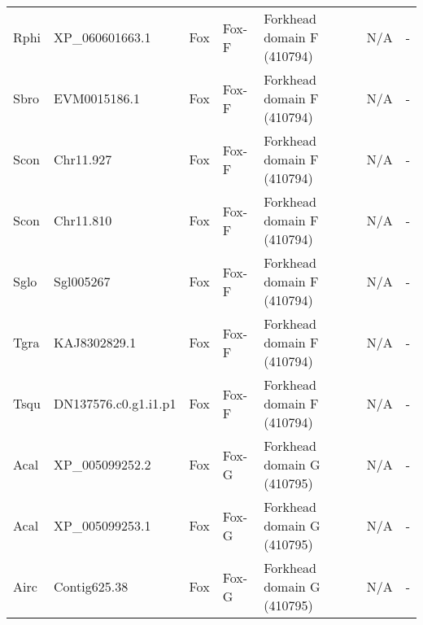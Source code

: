 \documentclass[../main.tex]{subfiles}
\begin{document}
\begin{landscape}
\begin{longtable}{lllllll}
		Rphi           & XP\_060601663.1       & Fox            & Fox-F               & Forkhead domain F (410794)                  & N/A                                                                    & -                    \\
		Sbro           & EVM0015186.1          & Fox            & Fox-F               & Forkhead domain F (410794)                  & N/A                                                                    & -                    \\
		Scon           & Chr11.927             & Fox            & Fox-F               & Forkhead domain F (410794)                  & N/A                                                                    & -                    \\
		Scon           & Chr11.810             & Fox            & Fox-F               & Forkhead domain F (410794)                  & N/A                                                                    & -                    \\
		Sglo           & Sgl005267             & Fox            & Fox-F               & Forkhead domain F (410794)                  & N/A                                                                    & -                    \\
		Tgra           & KAJ8302829.1          & Fox            & Fox-F               & Forkhead domain F (410794)                  & N/A                                                                    & -                    \\
		Tsqu           & DN137576.c0.g1.i1.p1  & Fox            & Fox-F               & Forkhead domain F (410794)                  & N/A                                                                    & -                    \\
		Acal           & XP\_005099252.2       & Fox            & Fox-G               & Forkhead domain G (410795)                  & N/A                                                                    & -                    \\
		Acal           & XP\_005099253.1       & Fox            & Fox-G               & Forkhead domain G (410795)                  & N/A                                                                    & -                    \\
		Airc           & Contig625.38          & Fox            & Fox-G               & Forkhead domain G (410795)                  & N/A                                                                    & -                    \\

\end{longtable}
\end{landscape}
\end{document}
